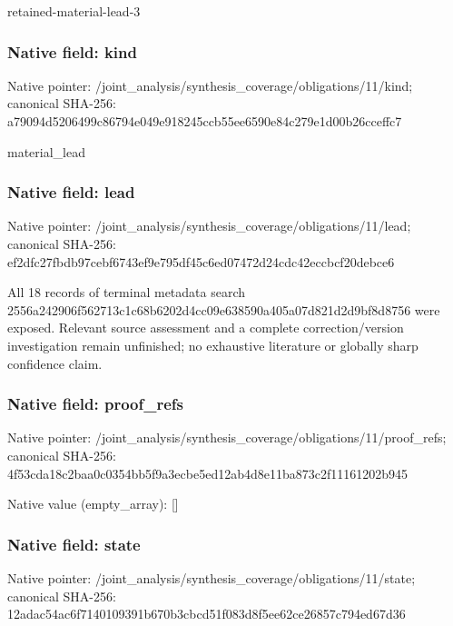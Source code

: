 \documentclass[10pt,a4paper]{article}
\begin{document}
\begingroup\raggedright\sloppy retained-material-lead-3\par\endgroup

\subsubsection{Native field: kind}
Native pointer: /joint\_\allowbreak{}analysis/synthesis\_\allowbreak{}coverage/obligations/11/kind; canonical SHA-256: a79094d5206499c86794e049e918245ccb55ee6590e84c279e1d00b26cceffc7

\begingroup\raggedright\sloppy material\_\allowbreak{}lead\par\endgroup

\subsubsection{Native field: lead}
Native pointer: /joint\_\allowbreak{}analysis/synthesis\_\allowbreak{}coverage/obligations/11/lead; canonical SHA-256: ef2dfc27fbdb97cebf6743ef9e795df45c6ed07472d24cdc42eccbcf20debce6

\begingroup\raggedright\sloppy All 18 records of terminal metadata search 2556a242906f562713c1c68b6202d4cc09e638590a405a07d821d2d9bf8d8756 were exposed. Relevant source assessment and a complete correction/\allowbreak{}version investigation remain unfinished;\allowbreak{} no exhaustive literature or globally sharp confidence claim.\par\endgroup

\subsubsection{Native field: proof\_\allowbreak{}refs}
Native pointer: /joint\_\allowbreak{}analysis/synthesis\_\allowbreak{}coverage/obligations/11/proof\_\allowbreak{}refs; canonical SHA-256: 4f53cda18c2baa0c0354bb5f9a3ecbe5ed12ab4d8e11ba873c2f11161202b945

Native value (empty\_\allowbreak{}array): []

\subsubsection{Native field: state}
Native pointer: /joint\_\allowbreak{}analysis/synthesis\_\allowbreak{}coverage/obligations/11/state; canonical SHA-256: 12adac54ac6f7140109391b670b3cbcd51f083d8f5ee62ce26857c794ed67d36
\end{document}

